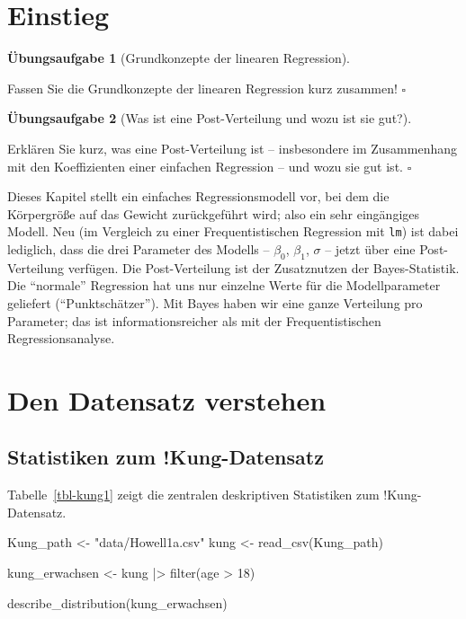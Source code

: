 \documentclass[
  ngerman,
  letterpaper,
  twoside,
  open=any]{scrbook}
\newenvironment{Shaded}{\begin{snugshade}}{\end{snugshade}}
\newcommand{\DecValTok}[1]{\textcolor[rgb]{0.68,0.00,0.00}{#1}}
\newcommand{\FunctionTok}[1]{\textcolor[rgb]{0.28,0.35,0.67}{#1}}
\newcommand{\NormalTok}[1]{\textcolor[rgb]{0.00,0.23,0.31}{#1}}
\newcommand{\OtherTok}[1]{\textcolor[rgb]{0.00,0.23,0.31}{#1}}
\newcommand{\SpecialCharTok}[1]{\textcolor[rgb]{0.37,0.37,0.37}{#1}}
\newcommand{\StringTok}[1]{\textcolor[rgb]{0.13,0.47,0.30}{#1}}
\theoremstyle{definition}
\theoremstyle{plain}
\theoremstyle{definition}
\newtheorem{exercise}{Übungsaufgabe}[chapter]
\theoremstyle{definition}
\theoremstyle{definition}
\theoremstyle{definition}
\newtheorem{exercise}{Übungsaufgabe}[chapter]
\theoremstyle{remark}
\begin{document}
\section{Einstieg}\label{einstieg-1}

\begin{exercise}[Grundkonzepte der linearen
Regression]\protect\hypertarget{exr-wdh-lm}{}\label{exr-wdh-lm}

Fassen Sie die Grundkonzepte der linearen Regression kurz zusammen!
\(\square\)

\end{exercise}

\begin{exercise}[Was ist eine Post-Verteilung und wozu ist sie
gut?]\protect\hypertarget{exr-wdh-post}{}\label{exr-wdh-post}

Erklären Sie kurz, was eine Post-Verteilung ist -- insbesondere im
Zusammenhang mit den Koeffizienten einer einfachen Regression -- und
wozu sie gut ist. \(\square\)

\end{exercise}

Dieses Kapitel stellt ein einfaches Regressionsmodell vor, bei dem die
Körpergröße auf das Gewicht zurückgeführt wird; also ein sehr
eingängiges Modell. Neu (im Vergleich zu einer Frequentistischen
Regression mit \texttt{lm}) ist dabei lediglich, dass die drei Parameter
des Modells -- \(\beta_0\), \(\beta_1\), \(\sigma\) -- jetzt über eine
Post-Verteilung verfügen. Die Post-Verteilung ist der Zusatznutzen der
Bayes-Statistik. Die \enquote{normale} Regression hat uns nur einzelne
Werte für die Modellparameter geliefert (\enquote{Punktschätzer}). Mit
Bayes haben wir eine ganze Verteilung pro Parameter; das ist
informationsreicher als mit der Frequentistischen Regressionsanalyse.

\section{Den Datensatz verstehen}\label{den-datensatz-verstehen}

\subsection{Statistiken zum
!Kung-Datensatz}\label{statistiken-zum-kung-datensatz}

Tabelle~\ref{tbl-kung1} zeigt die zentralen deskriptiven Statistiken zum
!Kung-Datensatz.

\begin{Shaded}
\begin{Highlighting}[]
\NormalTok{Kung\_path }\OtherTok{\textless{}{-}} \StringTok{"data/Howell1a.csv"}  
\NormalTok{kung }\OtherTok{\textless{}{-}} \FunctionTok{read\_csv}\NormalTok{(Kung\_path)  }

\NormalTok{kung\_erwachsen }\OtherTok{\textless{}{-}}\NormalTok{ kung }\SpecialCharTok{|\textgreater{}} \FunctionTok{filter}\NormalTok{(age }\SpecialCharTok{\textgreater{}} \DecValTok{18}\NormalTok{)}

\FunctionTok{describe\_distribution}\NormalTok{(kung\_erwachsen)}
\end{Highlighting}
\end{Shaded}
\end{document}
